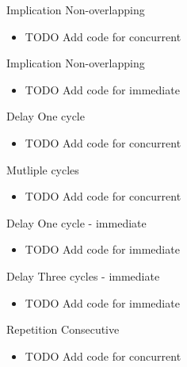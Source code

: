 \documentclass{beamer}
\begin{document}
\begin{frame}{Implication}
Non-overlapping

\begin{itemize}
 \item TODO Add code for concurrent
\end{itemize}
\end{frame}


\begin{frame}{Implication}
Non-overlapping

\begin{itemize}
 \item TODO Add code for immediate
\end{itemize}
\end{frame}


\begin{frame}{Delay}
One cycle

\begin{itemize}
 \item TODO Add code for concurrent
\end{itemize}

Mutliple cycles
\begin{itemize}
 \item TODO Add code for concurrent
\end{itemize}
\end{frame}


\begin{frame}{Delay}
One cycle - immediate

\begin{itemize}
 \item TODO Add code for immediate
\end{itemize}
\end{frame}


\begin{frame}{Delay}
Three cycles - immediate

\begin{itemize}
 \item TODO Add code for immediate
\end{itemize}
\end{frame}


\begin{frame}{Repetition}
Consecutive

\begin{itemize}
 \item TODO Add code for concurrent
\end{itemize}
\end{frame}
\end{document}
